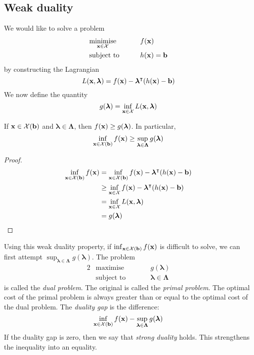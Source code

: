 \subsection{Weak duality}
We would like to solve a problem
\begin{alignat*}{2}
	 & \underset{\vb x \in \mathcal X}{\text{minimise}} & \qquad & f(\vb x)         \\
	 & \text{subject to}                                &        & h(\vb x) = \vb b
\end{alignat*}
by constructing the Lagrangian
\[
	L(\vb x, \bm \lambda) = f(\vb x) - \bm\lambda^\intercal (h(\vb x) - \vb b)
\]
We now define the quantity
\[
	g(\bm \lambda) = \inf_{\vb x \in \mathcal X} L(\vb x, \bm \lambda)
\]
\begin{theorem}
	If \( \vb x \in \mathcal X(\vb b) \) and \( \bm\lambda \in \bm\Lambda \), then \( f(\vb x) \geq g(\bm \lambda) \).
	In particular,
	\[
		\inf_{\vb x \in \mathcal X(\vb b)} f(\vb x) \geq \sup_{\bm \lambda \in \bm \Lambda} g(\bm \lambda)
	\]
\end{theorem}
\begin{proof}
	\begin{align*}
		\inf_{\vb x \in \mathcal X(\vb b)} f(\vb x) & = \inf_{\vb x \in \mathcal X(\vb b)} f(\vb x) - \bm \lambda^\intercal (h(\vb x) - \vb b) \\
		                                            & \geq \inf_{\vb x \in \mathcal X} f(\vb x) - \bm \lambda^\intercal (h(\vb x) - \vb b)     \\
		                                            & = \inf_{\vb x \in \mathcal X} L(\vb x, \bm \lambda)                                       \\
		                                            & = g(\bm\lambda)
	\end{align*}
\end{proof}
Using this weak duality property, if \( \inf_{\vb x \in \mathcal X(\vb b)} f(\vb x) \) is difficult to solve, we can first attempt \( \sup_{\bm \lambda \in \bm \Lambda} g(\bm \lambda) \).
The problem
\begin{alignat*}{2}
	 & \text{maximise}   & \qquad & g(\bm \lambda)              \\
	 & \text{subject to} &        & \bm \lambda \in \bm \Lambda
\end{alignat*}
is called the \textit{dual problem}.
The original is called the \textit{primal problem}.
The optimal cost of the primal problem is always greater than or equal to the optimal cost of the dual problem.
The \textit{duality gap} is the difference:
\[
	\inf_{\vb x \in \mathcal X(\vb b)} f(\vb x) - \sup_{\bm \lambda \in \bm \Lambda} g(\bm \lambda)
\]
If the duality gap is zero, then we say that \textit{strong duality} holds.
This strengthens the inequality into an equality.

